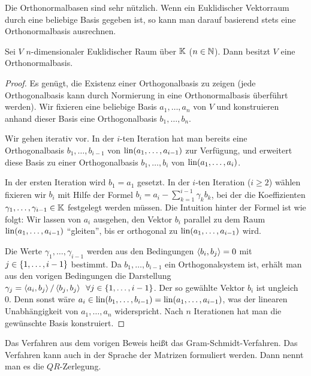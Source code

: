 Die Orthonormalbasen sind sehr nützlich. Wenn ein Euklidischer Vektorraum durch eine beliebige Basis gegeben ist, so kann man darauf basierend stets eine Orthonormalbasis ausrechnen. 

\begin{thm}
	Sei $ V $ $ n $-dimensionaler Euklidischer Raum über $ \mathbb K $ ($ n \in \mathbb N $). Dann besitzt $ V $ eine Orthonormalbasis.
\end{thm}
\begin{proof}
	Es genügt, die Existenz einer Orthogonalbasis zu zeigen (jede Orthogonalbasis kann durch Normierung in eine Orthonormalbasis überführt werden). Wir fixieren eine beliebige Basis $ a_1, \ldots, a_n $ von $ V $ und konstruieren anhand dieser Basis eine Orthogonalbasis $ b_1, \ldots, b_n $.
	
	Wir gehen iterativ vor. In der $ i $-ten Iteration hat man bereits eine Orthogonalbasis $ b_1, \ldots, b_{i-1} $ von $ \operatorname{lin}(a_1, \ldots, a_{i-1}) $ zur Verfügung, und erweitert diese Basis zu einer Orthogonalbasis $ b_1, \ldots, b_i $ von $ \operatorname{lin}(a_1, \ldots, a_i) $. 
	
	In der ersten Iteration wird $ b_1 = a_1 $ gesetzt. In der $ i $-ten Iteration ($ i \geq 2 $) wählen fixieren wir $b_i$ mit Hilfe der Formel $ b_i = a_i - \sum_{k=1}^{i-1} \gamma_kb_k $, bei der die Koeffizienten $ \gamma_1, \ldots, \gamma_{i-1} \in \mathbb K $ festgelegt werden müssen. Die Intuition hinter der Formel ist wie folgt: Wir lassen von $a_i$ ausgehen, den Vektor $b_i$ parallel zu dem Raum $\operatorname{lin}(a_1,\ldots,a_{i-1})$ ``gleiten'', bis er orthogonal zu $\operatorname{lin}(a_1,\ldots,a_{i-1})$ wird. 
	
	Die Werte $ \gamma_1, \ldots, \gamma_{i-1} $ werden aus den Bedingungen $ \left\langle b_i,b_j \right\rangle = 0 $ mit $ j \in \{ 1,\ldots,i-1 \} $ bestimmt. Da $ b_1, \ldots, b_{i-1} $ ein Orthogonalsystem ist, erhält man aus den vorigen Bedingungen die Darstellung $ \gamma_j = \left\langle a_i,b_j \right\rangle / \left\langle b_j,b_j \right\rangle \enspace \forall j \in \{ 1,\ldots,i-1 \} $. Der so gewählte Vektor $ b_i $ ist ungleich 0. Denn sonst wäre $ a_i \in \operatorname{lin}(b_1, \ldots, b_{i-1}) = \operatorname{lin}(a_1, \ldots, a_{i-1}) $, was der linearen Unabhängigkeit von $ a_1, \ldots, a_n $ widerspricht. Nach $ n $ Iterationen hat man die gewünschte Basis konstruiert.
\end{proof}

\begin{bem}
	Das Verfahren aus dem vorigen Beweis heißt das Gram-Schmidt-Verfahren. Das Verfahren kann auch in der Sprache der Matrizen formuliert werden. Dann nennt man es die $QR$-Zerlegung. 
\end{bem}

